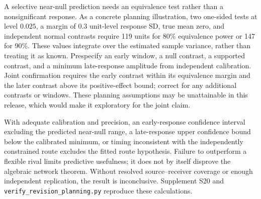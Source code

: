 A selective near-null prediction needs an equivalence test rather than a nonsignificant response. As a concrete planning illustration, two one-sided tests at level $0.025$, a margin of $0.3$ unit-level response SD, true mean zero, and independent normal contrasts require 119 units for 80\% equivalence power or 147 for 90\%. These values integrate over the estimated sample variance, rather than treating it as known. Prespecify an early window, a null contrast, a supported contrast, and a minimum late-response amplitude from independent calibration. Joint confirmation requires the early contrast within its equivalence margin and the later contrast above its positive-effect bound; correct for any additional contrasts or windows. These planning assumptions may be unattainable in this release, which would make it exploratory for the joint claim.

With adequate calibration and precision, an early-response confidence interval excluding the predicted near-null range, a late-response upper confidence bound below the calibrated minimum, or timing inconsistent with the independently constrained route excludes the fitted route hypothesis. Failure to outperform a flexible rival limits predictive usefulness; it does not by itself disprove the algebraic network theorem. Without resolved source--receiver coverage or enough independent replication, the result is inconclusive. Supplement S20 and \texttt{verify\_revision\_planning.py} reproduce these calculations.
